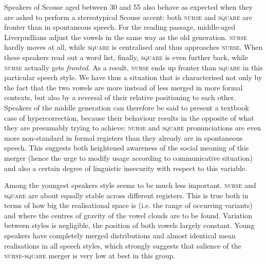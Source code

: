 Speakers of Scouse aged between 30 and 55 also behave as expected when they are asked to perform a stereotypical Scouse accent: both \textsc{nurse} and \textsc{square} are fronter than in spontaneous speech.
For the reading passage, middle-aged Liverpudlians adjust the vowels in the same way as the old generation.
\textsc{nurse} hardly moves at all, while \textsc{square} is centralised and thus approaches \textsc{nurse}.
When these speakers read out a word list, finally, \textsc{square} is even further back, while \textsc{nurse} actually gets \emph{fronted}.
As a result, \textsc{nurse} ends up fronter than \textsc{square} in this particular speech style.
We have thus a situation that is characterised not only by the fact that the two vowels are more instead of less merged in more formal contexts, but also by a reversal of their relative positioning to each other.
Speakers of the middle generation can therefore be said to present a textbook case of hypercorrection, because their behaviour results in the opposite of what they are presumably trying to achieve: \textsc{nurse} and \textsc{square} pronunciations are even more non-standard in formal registers than they already are in spontaneous speech.
This suggests both heightened awareness of the social meaning of this merger (hence the urge to modify usage according to communicative situation) and also a certain degree of linguistic insecurity with respect to this variable.

Among the youngest speakers style seems to be much less important.
\textsc{nurse} and \textsc{square} are about equally stable across different registers.
This is true both in terms of how big the realisational space is (i.e. the range of occurring variants) and where the centres of gravity of the vowel clouds are to be found.
Variation between styles is negligible, the position of both vowels largely constant.
Young speakers have completely merged distributions and almost identical mean realisations in all speech styles, which strongly suggests that salience of the \textsc{nurse}-\textsc{square} merger is very low at best in this group.

